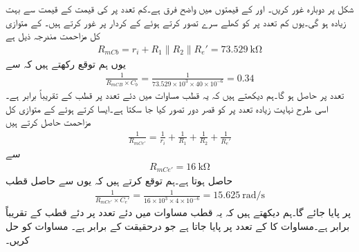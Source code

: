 شکل  پر دوبارہ غور کریں۔ اور  کے قیمتوں میں واضح فرق ہے۔کم تعدد پر  کی قیمت  کے قیمت سے بہت زیادہ ہو گی۔یوں کم تعدد پر  کو کھلے سرے تصور کرتے ہوئے  کے کردار پر غور کرتے ہیں۔ کے متوازی کل مزاحمت  مندرجہ ذیل ہے
\begin{align*}
R_{mCb}=r_i+ R_1 \mathbin{\|} R_2 \mathbin{\|} R_e'=\SI{73.529}{\kilo \ohm}
\end{align*}
یوں ہم توقع رکھتے ہیں کہ  سے
\begin{align*}
\frac{1}{R_{mCB} \times C_b}=\frac{1}{73.529 \times 10^3 \times 40 \times 10^{-6}}=\num{0.34}
\end{align*}
تعدد پر  حاصل ہو گا۔ہم دیکھتے ہیں کہ یہ قطب مساوات  میں دئے  تعدد پر قطب کے تقریباً برابر ہے۔اسی طرح نہایت زیادہ تعدد پر  کو قصر دور تصور کیا جا سکتا ہے۔ایسا کرتے ہوئے  کے متوازی کل مزاحمت حاصل کرتے ہیں
\begin{align*}
\frac{1}{R_{mCe'}}=\frac{1}{r_i}+\frac{1}{R_1}+\frac{1}{R_2}+\frac{1}{R_e'}
\end{align*}
سے
\begin{align*}
R_{mCe'}=\SI{16}{\kilo \ohm}
\end{align*}
حاصل ہوتا ہے۔ہم توقع کرتے ہیں کہ یوں  سے حاصل قطب
\begin{align*}
\frac{1}{R_{mCe'} \times C_e'}=\frac{1}{16 \times 10^{3} \times 4 \times 10^{-6}}=\SI{15.625}{\radian \per \second}
\end{align*}
پر پایا جائے گا۔ہم دیکھتے ہیں کہ یہ قطب مساوات  میں دئے  تعدد پر دئے قطب کے  تقریباً برابر ہے۔مساوات کا    کے تعدد پر پایا جاتا ہے جو درحقیقت  کے برابر ہے۔
مساوات  کو حل کریں۔

